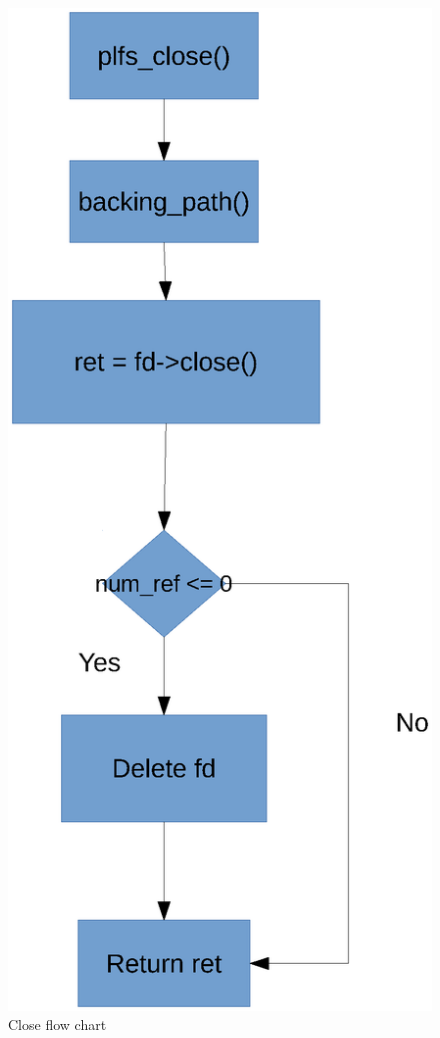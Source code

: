 \documentclass[conference]{IEEEtran}
\begin{document}
\begin{figure}
	\centerline{
		\includegraphics[scale=0.8]{close.eps}}
	\caption{Close flow chart}
\end{figure}
\end{document}
